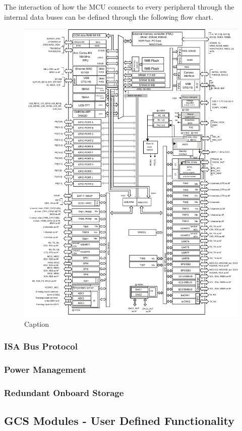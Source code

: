 The interaction of how the MCU connects to every peripheral through the internal data buses can be defined through the following flow chart.
\begin{figure}[h]
    \centering
    \includegraphics[width=0.9\linewidth]{img/STM32F439IIH6 Internal databus flowchart.PNG}
    \caption{Caption}
    \label{fig:enter-label}
\end{figure}
\subsubsection{ISA Bus Protocol}
\subsubsection{Power Management}
\subsubsection{Redundant Onboard Storage}
\subsection{GCS Modules - User Defined Functionality}
